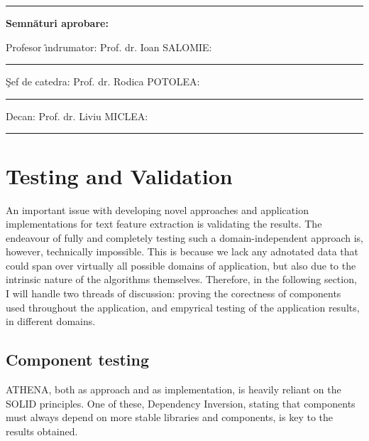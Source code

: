 \documentclass[12pt,a4paper,twoside]{report}
\newcommand{\uline}[1]{\rule[0pt]{#1}{0.4pt}}
\begin{document}
\vspace{0.5cm}
\hspace{8cm} \uline{5cm}

\vspace{0.5cm}
\textbf{Semn\u{a}turi aprobare:}

Profesor \^{\i}ndrumator: Prof. dr. Ioan SALOMIE: \uline{5cm}

\vspace{0.5cm}

\c{S}ef de catedra: Prof. dr. Rodica POTOLEA: \uline{5cm}

\vspace{0.5cm}

Decan: Prof. dr. Liviu MICLEA: \uline{5cm}

\newpage




\newpage

\listoffigures
\tableofcontents
\newpage









\chapter{Testing and Validation}
An important issue with developing novel approaches and application implementations for text feature extraction is validating the results. The endeavour of fully and completely testing such a domain-independent approach is, however, technically impossible. This is because we lack any adnotated data that could span over virtually all possible domains of application, but also due to the intrinsic nature of the algorithms themselves. Therefore, in the following section, I will handle two threads of discussion: proving the corectness of components used throughout the application, and empyrical testing of the application results, in different domains.

\section{Component testing}
ATHENA, both as approach and as implementation, is heavily reliant on the SOLID principles. One of these, Dependency Inversion, stating that components must always depend on more stable libraries and components, is key to the results obtained.
\end{document}
